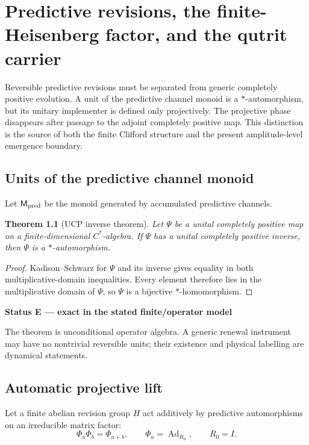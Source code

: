 \documentclass[11pt,oneside,openany]{book}
\numberwithin{equation}{chapter}
\newtheorem{theorem}{Theorem}[chapter]
\theoremstyle{definition}
\theoremstyle{remark}
\newcommand{\Ad}{\operatorname{Ad}}
\newenvironment{statusbox}[2]{%
  \par\medskip\noindent
  \begin{center}\begin{minipage}{0.94\textwidth}
  \colorbox{#1!8}{\parbox{\dimexpr\linewidth-2\fboxsep\relax}{\textbf{#2}}}\par\smallskip
}{%
  \end{minipage}\end{center}\medskip
}
\newcommand{\Exact}[1]{\begin{statusbox}{ExactColor}{Status E --- exact in the stated finite/operator model}#1\end{statusbox}}
\begin{document}
\chapter{Predictive revisions, the finite-Heisenberg factor, and the qutrit carrier}
\label{ch:revision-factor}

Reversible predictive revisions must be separated from generic completely
positive evolution.  A unit of the predictive channel monoid is a
\(*\)-automorphism, but its unitary implementer is defined only projectively.
The projective phase disappears after passage to the adjoint completely
positive map.  This distinction is the source of both the finite Clifford
structure and the present amplitude-level emergence boundary.

\section{Units of the predictive channel monoid}

Let \(\mathsf M_{\rm pred}\) be the monoid generated by accumulated predictive
channels.

\begin{theorem}[UCP inverse theorem]
\label{thm:ucp-unit}
Let \(\Psi\) be a unital completely positive map on a finite-dimensional
\(C^*\)-algebra.  If \(\Psi\) has a unital completely positive inverse, then
\(\Psi\) is a \(*\)-automorphism.
\end{theorem}

\begin{proof}
Kadison--Schwarz for \(\Psi\) and its inverse gives equality in both
multiplicative-domain inequalities.  Every element therefore lies in the
multiplicative domain of \(\Psi\), so \(\Psi\) is a bijective
\(*\)-homomorphism.
\end{proof}

\Exact{The theorem is unconditional operator algebra.  A generic renewal
instrument may have no nontrivial reversible units; their existence and
physical labelling are dynamical statements.}

\section{Automatic projective lift}

Let a finite abelian revision group \(H\) act additively by predictive
automorphisms on an irreducible matrix factor:
\[
 \Phi_a\Phi_b=\Phi_{a+b},
 \qquad
 \Phi_a=\Ad_{R_a},
 \qquad
 R_0=I.
\]
\end{document}
